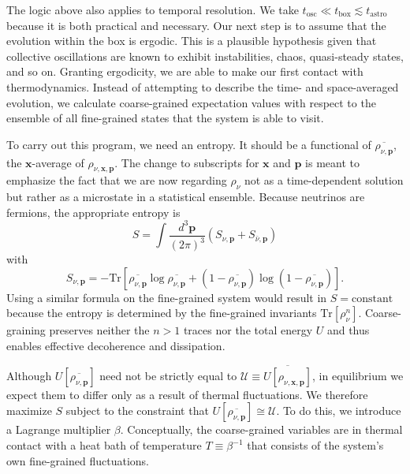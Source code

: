 \documentclass[aps,prl,twocolumn,groupedaddress]{revtex4-2}
\begin{document}
The logic above also applies to temporal resolution. We take $t_\textrm{osc} \ll t_\textrm{box} \lesssim t_\textrm{astro}$ because it is both practical and necessary. Our next step is to assume that the evolution within the box is ergodic. This is a plausible hypothesis given that collective oscillations are known to exhibit instabilities, chaos, quasi-steady states, and so on. Granting ergodicity, we are able to make our first contact with thermodynamics. Instead of attempting to describe the time- and space-averaged evolution, we calculate coarse-grained expectation values with respect to the ensemble of all fine-grained states that the system is able to visit.

To carry out this program, we need an entropy. It should be a functional of $\overline{\rho_{\nu,\boldsymbol{p}}}$, the $\boldsymbol{x}$-average of $\rho_{\nu,\boldsymbol{x},\boldsymbol{p}}$. The change to subscripts for $\boldsymbol{x}$ and $\boldsymbol{p}$ is meant to emphasize the fact that we are now regarding $\rho_\nu$ not as a time-dependent solution but rather as a microstate in a statistical ensemble. Because neutrinos are fermions, the appropriate entropy is
\begin{equation}
S = \int \frac{d^3 \boldsymbol{p}}{(2\pi)^3} \left( S_{\nu,\boldsymbol{p}} + S_{\bar{\nu},\boldsymbol{p}} \right) \label{eq:entropy1}
\end{equation}
with
\begin{equation}
S_{\nu,\boldsymbol{p}} = -\textrm{Tr} \left[ \overline{\rho_{\nu,\boldsymbol{p}}} \log \overline{\rho_{\nu,\boldsymbol{p}}} + \left( 1 - \overline{\rho_{\nu,\boldsymbol{p}}} \right) \log \left( 1 - \overline{\rho_{\nu,\boldsymbol{p}}} \right) \right]. \label{eq:entropy2}
\end{equation}
Using a similar formula on the fine-grained system would result in $S = \textrm{constant}$ because the entropy is determined by the fine-grained invariants $\textrm{Tr}\left[ \rho_\nu^n \right]$. Coarse-graining preserves neither the $n>1$ traces nor the total energy $U$ and thus enables effective decoherence and dissipation.

Although $U[\overline{\rho_{\nu,\boldsymbol{p}}}]$ need not be strictly equal to $\mathcal{U} \equiv \overline{U[\rho_{\nu,\boldsymbol{x},\boldsymbol{p}}]}$, in equilibrium we expect them to differ only as a result of thermal fluctuations. We therefore maximize $S$ subject to the constraint that $U[\overline{\rho_{\nu,\boldsymbol{p}}}] \cong \mathcal{U}$. To do this, we introduce a Lagrange multiplier $\beta$. Conceptually, the coarse-grained variables are in thermal contact with a heat bath of temperature $T \equiv \beta^{-1}$ that consists of the system's own fine-grained fluctuations.
\end{document}
